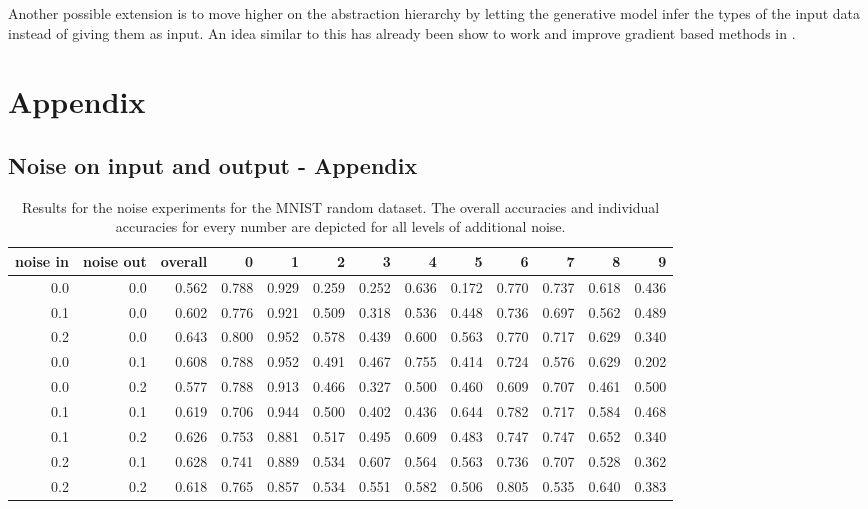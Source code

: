 \documentclass{article}
\begin{document}
Another possible extension is to move higher on the abstraction hierarchy by letting the generative model infer the types of the input data instead of giving them as input. An idea similar to this has already been show to work and improve gradient based methods in \cite{REPRISE2018}. 





\section*{Appendix}

\subsection{Noise on input and output - Appendix}
\label{subsec:results_noise_appendix}
\begin{table}[!htb]
	\centering
	\caption{Results for the noise experiments for the MNIST random dataset. The overall accuracies and individual accuracies for every number are depicted for all levels of additional noise.}
	\begin{tabular}{rr||r|rrrrrrrrrr}
		\toprule
		noise in &  noise out &  overall &      0 &      1 &      2 &      3 &      4 &      5 &      6 &      7 &      8 &      9 \\
		\midrule
		0.0 &        0.0 &    0.562 &  0.788 &  0.929 &  0.259 &  0.252 &  0.636 &  0.172 &  0.770 &  0.737 &  0.618 &  0.436 \\
		0.1 &        0.0 &    0.602 &  0.776 &  0.921 &  0.509 &  0.318 &  0.536 &  0.448 &  0.736 &  0.697 &  0.562 &  0.489 \\
		0.2 &        0.0 &    0.643 &  0.800 &  0.952 &  0.578 &  0.439 &  0.600 &  0.563 &  0.770 &  0.717 &  0.629 &  0.340 \\
		0.0 &        0.1 &    0.608 &  0.788 &  0.952 &  0.491 &  0.467 &  0.755 &  0.414 &  0.724 &  0.576 &  0.629 &  0.202 \\
		0.0 &        0.2 &    0.577 &  0.788 &  0.913 &  0.466 &  0.327 &  0.500 &  0.460 &  0.609 &  0.707 &  0.461 &  0.500 \\
		0.1 &        0.1 &    0.619 &  0.706 &  0.944 &  0.500 &  0.402 &  0.436 &  0.644 &  0.782 &  0.717 &  0.584 &  0.468 \\
		0.1 &        0.2 &    0.626 &  0.753 &  0.881 &  0.517 &  0.495 &  0.609 &  0.483 &  0.747 &  0.747 &  0.652 &  0.340 \\
		0.2 &        0.1 &    0.628 &  0.741 &  0.889 &  0.534 &  0.607 &  0.564 &  0.563 &  0.736 &  0.707 &  0.528 &  0.362 \\
		0.2 &        0.2 &    0.618 &  0.765 &  0.857 &  0.534 &  0.551 &  0.582 &  0.506 &  0.805 &  0.535 &  0.640 &  0.383 \\
		\bottomrule
	\end{tabular}
	\label{table:MNIST_random_results}
\end{table}
\end{document}
